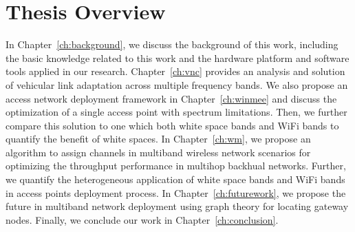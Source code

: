 \section{Thesis Overview}

In Chapter~\ref{ch:background}, we discuss the background of this work, 
including the basic knowledge related to this work and the hardware 
platform and software tools applied in our research. Chapter~\ref{ch:vnc} 
provides an analysis and solution of vehicular link adaptation across multiple frequency bands. 
We also propose an access network deployment 
framework in Chapter~\ref{ch:winmee} and discuss the optimization of a 
single access point with spectrum limitations. Then, we further
compare this solution to one which both white space bands and WiFi 
bands to quantify the benefit of white spaces. In Chapter~\ref{ch:wm}, we propose an 
algorithm to assign channels in multiband wireless network scenarios for 
optimizing the throughput performance in multihop backhual networks. Further, we 
quantify the heterogeneous application of white space bands and WiFi bands 
in access points deployment process. In Chapter~\ref{ch:futurework}, we 
propose the future in multiband network deployment using graph theory for locating
gateway nodes. 
Finally, we conclude our work in Chapter~\ref{ch:conclusion}.

